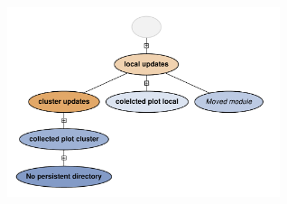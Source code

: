 \href{http://alps.comp-phys.org/vistrails/download.php?getvt=2&db=tutorials&host=alps.ethz.ch&port=3306&tag=&execute=False&showspreadsheetonly=False}{\includegraphics[width=8cm]{vistrails_images/alps.ethz.ch_tutorials_3306_2_pdf/graph_2.pdf}
}